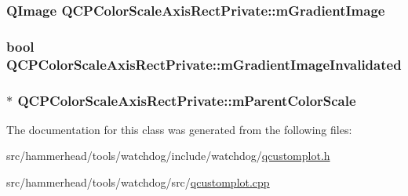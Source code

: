 \subsubsection[{\texorpdfstring{m\+Gradient\+Image}{mGradientImage}}]{\setlength{\rightskip}{0pt plus 5cm}Q\+Image Q\+C\+P\+Color\+Scale\+Axis\+Rect\+Private\+::m\+Gradient\+Image\hspace{0.3cm}{\ttfamily [protected]}}\hypertarget{classQCPColorScaleAxisRectPrivate_ad4f7c8ee1c6012d9950870811773119c}{}\label{classQCPColorScaleAxisRectPrivate_ad4f7c8ee1c6012d9950870811773119c}
\subsubsection[{\texorpdfstring{m\+Gradient\+Image\+Invalidated}{mGradientImageInvalidated}}]{\setlength{\rightskip}{0pt plus 5cm}bool Q\+C\+P\+Color\+Scale\+Axis\+Rect\+Private\+::m\+Gradient\+Image\+Invalidated\hspace{0.3cm}{\ttfamily [protected]}}\hypertarget{classQCPColorScaleAxisRectPrivate_a2c0b15b071e1f93006b48b5be022a631}{}\label{classQCPColorScaleAxisRectPrivate_a2c0b15b071e1f93006b48b5be022a631}
\subsubsection[{\texorpdfstring{m\+Parent\+Color\+Scale}{mParentColorScale}}]{$\ast$ Q\+C\+P\+Color\+Scale\+Axis\+Rect\+Private\+::m\+Parent\+Color\+Scale\hspace{0.3cm}{\ttfamily [protected]}}\hypertarget{classQCPColorScaleAxisRectPrivate_a311c73f51a4cb0b556388197833cf099}{}\label{classQCPColorScaleAxisRectPrivate_a311c73f51a4cb0b556388197833cf099}


The documentation for this class was generated from the following files\+:\begin{DoxyCompactItemize}
\item 
src/hammerhead/tools/watchdog/include/watchdog/\hyperlink{qcustomplot_8h}{qcustomplot.\+h}\item 
src/hammerhead/tools/watchdog/src/\hyperlink{qcustomplot_8cpp}{qcustomplot.\+cpp}\end{DoxyCompactItemize}
